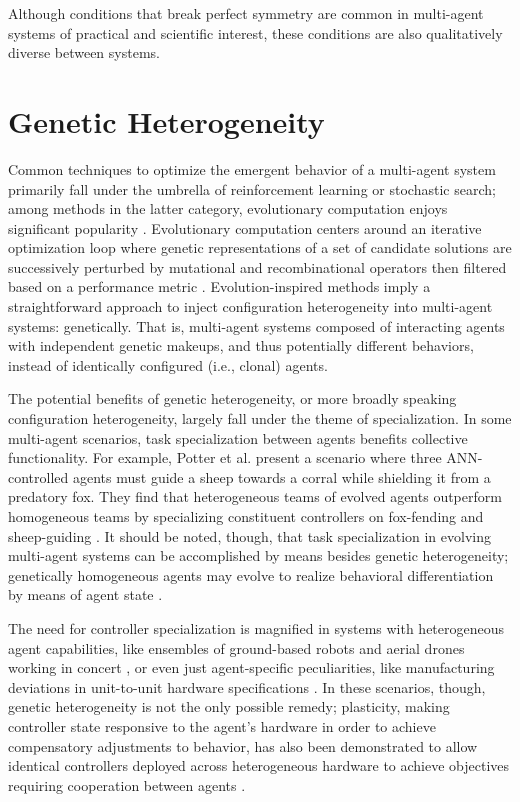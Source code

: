 Although conditions that break perfect symmetry are common in multi-agent systems of practical and scientific interest, these conditions are also qualitatively diverse between systems.

\section{Genetic Heterogeneity}

Common techniques to optimize the emergent behavior of a multi-agent system primarily fall under the umbrella of reinforcement learning or stochastic search; among methods in the latter category, evolutionary computation enjoys significant popularity \cite{panait2005cooperative}.
Evolutionary computation centers around an iterative optimization loop where genetic representations of a set of candidate solutions are successively perturbed by mutational and recombinational operators then filtered based on a performance metric \cite{fogel2000evolutionary}.
Evolution-inspired methods imply a straightforward approach to inject configuration heterogeneity into multi-agent systems: genetically.
That is, multi-agent systems composed of interacting agents with independent genetic makeups, and thus potentially different behaviors, instead of identically configured (i.e., clonal) agents.

The potential benefits of genetic heterogeneity, or more broadly speaking configuration heterogeneity, largely fall under the theme of specialization.
In some multi-agent scenarios, task specialization between agents benefits collective functionality.
For example, Potter et al. present a scenario where three ANN-controlled agents must guide a sheep towards a corral while shielding it from a predatory fox.
They find that heterogeneous teams of evolved agents outperform homogeneous teams by specializing constituent controllers on fox-fending and sheep-guiding \cite{potter2001heterogeneity}.
It should be noted, though, that task specialization in evolving multi-agent systems can be accomplished by means besides genetic heterogeneity;
genetically homogeneous agents may evolve to realize behavioral differentiation by means of agent state \cite{ferrante2015evolution}.

The need for controller specialization is magnified in systems with heterogeneous agent capabilities, like ensembles of ground-based robots and aerial drones working in concert \cite{gomes2015cooperative, mathews2012supervised}, or even just agent-specific peculiarities, like manufacturing deviations in unit-to-unit hardware specifications \cite{pugh2007parallel, duarte2016evolution}.
In these scenarios, though, genetic heterogeneity is not the only possible remedy;
plasticity, making controller state responsive to the agent's hardware in order to achieve compensatory adjustments to behavior, has also been demonstrated to allow identical controllers deployed across heterogeneous hardware to achieve objectives requiring cooperation between agents \cite{tuci2008evolving}.

